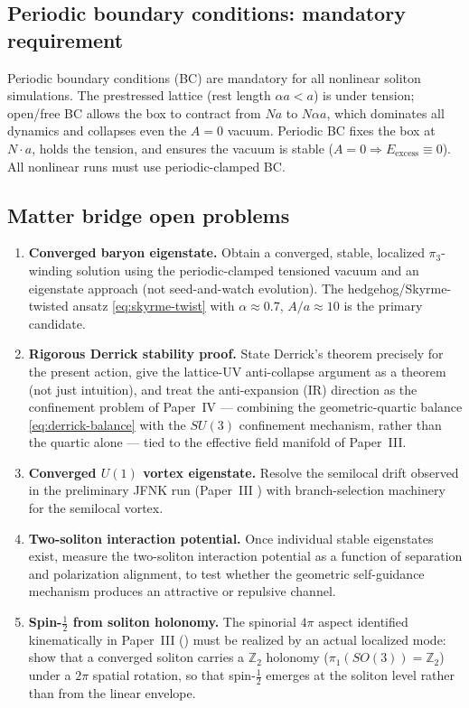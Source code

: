 \subsection{Periodic boundary conditions: mandatory requirement}
\label{subsec:periodic-bc}

Periodic boundary conditions (BC) are mandatory for all nonlinear soliton simulations.
The prestressed lattice (rest length $\alpha a < a$) is under tension; open/free BC allows the box
to contract from $Na$ to $N\alpha a$, which dominates all dynamics and collapses even the $A=0$
vacuum.
Periodic BC fixes the box at $N\cdot a$, holds the tension, and ensures the vacuum is stable
($A=0\Rightarrow E_{\mathrm{excess}}\equiv 0$).
All nonlinear runs must use periodic-clamped BC.

\subsection{Matter bridge open problems}
\label{subsec:matter-open}

\begin{enumerate}
  \item \textbf{Converged baryon eigenstate.}
  Obtain a converged, stable, localized $\pi_3$-winding solution using the periodic-clamped
  tensioned vacuum and an eigenstate approach (not seed-and-watch evolution).
  The hedgehog/Skyrme-twisted ansatz \eqref{eq:skyrme-twist} with $\alpha\approx 0.7$,
  $A/a\approx 10$ is the primary candidate.

  \item \textbf{Rigorous Derrick stability proof.}
  State Derrick's theorem precisely \citep{Derrick1964,MantonSutcliffe2004} for the present
  action, give the lattice-UV anti-collapse argument as a theorem (not just intuition), and treat
  the anti-expansion (IR) direction as the confinement problem of Paper~IV --- combining the
  geometric-quartic balance \eqref{eq:derrick-balance} with the $SU(3)$ confinement mechanism,
  rather than the quartic alone --- tied to the effective field manifold of Paper~III.

  \item \textbf{Converged $U(1)$ vortex eigenstate.}
  Resolve the semilocal drift observed in the preliminary JFNK run (Paper~III
  ) with branch-selection machinery for the semilocal vortex.

  \item \textbf{Two-soliton interaction potential.}
  Once individual stable eigenstates exist, measure the two-soliton interaction potential as a
  function of separation and polarization alignment, to test whether the geometric self-guidance
  mechanism produces an attractive or repulsive channel.

  \item \textbf{Spin-$\tfrac12$ from soliton holonomy.}
  The spinorial $4\pi$ aspect identified kinematically in Paper~III
  () must be realized by an actual localized mode: show that a
  converged soliton carries a $\mathbb{Z}_2$ holonomy ($\pi_1(SO(3))=\mathbb{Z}_2$) under a
  $2\pi$ spatial rotation, so that spin-$\tfrac12$ emerges at the soliton level rather than from
  the linear envelope.
\end{enumerate}